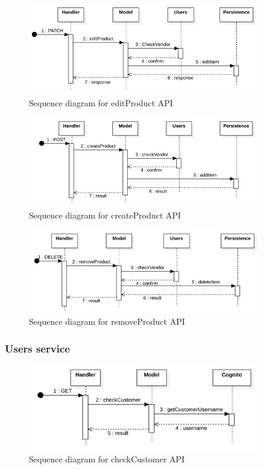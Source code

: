 \begin{figure}[H]
    \includegraphics[width=0.9\textwidth]{res/images/sequence-diagrams/products/editProduct.png}
    \caption{Sequence diagram for editProduct API}
\end{figure}

\begin{figure}[H]
    \includegraphics[width=0.9\textwidth]{res/images/sequence-diagrams/products/createProduct.png}
    \caption{Sequence diagram for createProduct API}
\end{figure}

\begin{figure}[H]
    \includegraphics[width=0.9\textwidth]{res/images/sequence-diagrams/products/removeProduct.png}
    \caption{Sequence diagram for removeProduct API}
\end{figure}


\subsubsection{Users service}
\begin{figure}[H]
    \includegraphics[width=0.9\textwidth]{res/images/sequence-diagrams/users/checkCustomer.png}
    \caption{Sequence diagram for checkCustomer API}
\end{figure}
